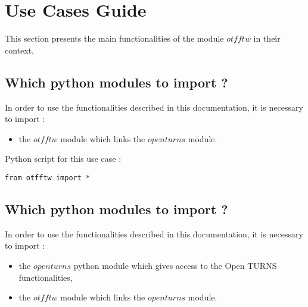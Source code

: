 % 




\section{Use Cases Guide}

This section presents the main functionalities of the module $otfftw$ in their context.



\subsection{Which python modules to import ?}

In order to use the functionalities described in this documentation, it is necessary to import  : 
\begin{itemize}
   \item the $otfftw$ module which links the $openturns$ module.
\end{itemize}

Python  script for this use case :

\begin{lstlisting}
from otfftw import *
\end{lstlisting}

\subsection{Which python modules to import ?}

In order to use the functionalities described in this documentation, it is necessary to import  : 
\begin{itemize}
   \item the $openturns$ python module which gives access to the Open TURNS functionalities,
   \item the $otfftw$ module which links the $openturns$ module.
\end{itemize}

